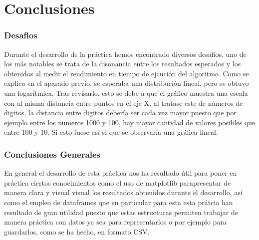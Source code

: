 \part{Conclusiones}

\section{Desafios}
Durante el desarrollo de la práctica hemos encontrado diversos desafios, uno de los más notables se trata de la disonancia entre los resultados esperados y los obtenidos al medir el rendimiento en tiempo de ejcución del algoritmo. Como se explica en el aparado previo, se esperaba una distribución lineal, pero se obtuvo una logarítmica. Tras revisarlo, esto se debe a que el gráfico muestra una escala con al misma distancia entre puntos en el eje X, al tratase este de números de digitos, la distancia entre digitos debería ser cada vez mayor puesto que por ejemplo entre los numeros 1000 y 100, hay mayor cantidad de valores posibles que entre 100 y 10. Si esto fuese así si que se observaría una gráfica lineal.

\section{Conclusiones Generales}
En general el desarrollo de esta práctica nos ha resultado útil para poner en práctica ciertos conocimientos como el uso de matplotlib parapresentar de manera clara y visual visual los resultados obtenidos durante el desarrollo, así como el empleo de dataframes que en particular para esta esta prátcia han resultado de gran utilidad puesto que estas estructuras permiten trabajar de manera práctica con datos ya sea para representarlos o por ejemplo para guardarlos, como se ha hecho, en formato CSV.



\newpage
